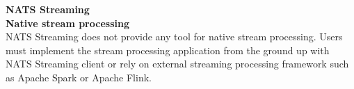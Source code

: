 \large \textbf{NATS Streaming}\\
\normalsize
\textbf{Native stream processing}\\
NATS Streaming does not provide any tool for native stream processing. Users must implement the stream processing application from the ground up with NATS Streaming client or rely on external streaming processing framework such as Apache Spark or Apache Flink.
